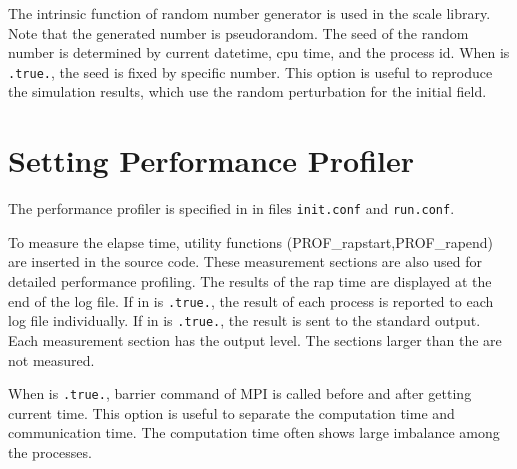 
\noindent
The intrinsic function of random number generator is used in the scale library. Note that the generated number is pseudorandom.
The seed of the random number is determined by current datetime, cpu time, and the process id.
%
When  is \verb|.true.|, the seed is fixed by specific number.
This option is useful to reproduce the simulation results, which use the random perturbation for the initial field.



\section{Setting Performance Profiler} \label{subsec:prof}

The performance profiler is specified in  in files \verb|init.conf| and \verb|run.conf|.


\noindent
To measure the elapse time, utility functions (PROF\_rapstart,PROF\_rapend) are inserted in the source code.
These measurement sections are also used for detailed performance profiling.
%
The results of the rap time are displayed at the end of the log file.
If  in   is \verb|.true.|, the result of each process is reported to each log file individually.
If  in  is \verb|.true.|, the result is sent to the standard output.
%
Each measurement section has the output level. The sections larger than the  are not measured.

When  is \verb|.true.|, barrier command of MPI is called before and after getting current time.
This option is useful to separate the computation time and communication time.
The computation time often shows large imbalance among the processes.
